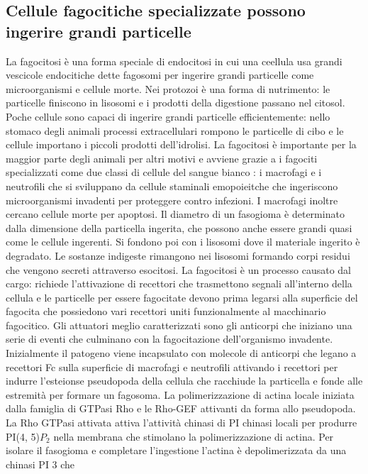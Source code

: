 \subsection{Cellule fagocitiche specializzate possono ingerire grandi particelle}
La fagocitosi \`e una forma speciale di endocitosi in cui una ceellula usa grandi vescicole endocitiche dette fagosomi per ingerire grandi particelle come microorganismi e cellule
morte. Nei protozoi \`e una forma di nutrimento: le particelle finiscono in lisosomi e i prodotti della digestione passano nel citosol. Poche cellule sono capaci di ingerire grandi 
particelle efficientemente: nello stomaco degli animali processi extracellulari rompono le particelle di cibo e le cellule importano i piccoli prodotti dell'idrolisi. La fagocitosi \`e
importante per la maggior parte degli animali per altri motivi e avviene grazie a i fagociti specializzati come due classi di cellule del sangue bianco : i macrofagi e i neutrofili che
si sviluppano da cellule staminali emopoieitche che ingeriscono microorganismi invadenti per proteggere contro infezioni. I macrofagi inoltre cercano cellule morte per apoptosi. Il 
diametro di un fasogioma \`e determinato dalla dimensione della particella ingerita, che possono anche essere grandi quasi come le cellule ingerenti. Si fondono poi con i lisosomi dove
il materiale ingerito \`e degradato. Le sostanze indigeste rimangono nei lisosomi formando corpi residui che vengono secreti attraverso esocitosi. La fagocitosi \`e un processo
causato dal cargo: richiede l'attivazione di recettori che trasmettono segnali all'interno della cellula e le particelle per essere fagocitate devono prima legarsi alla superficie
del fagocita che possiedono vari recettori uniti funzionalmente al macchinario fagocitico. Gli attuatori meglio caratterizzati sono gli anticorpi che iniziano una serie di eventi che
culminano con la fagocitazione dell'organismo invadente. Inizialmente il patogeno viene incapsulato con molecole di anticorpi che legano a recettori Fc sulla superficie di macrofagi e 
neutrofili attivando i recettori per indurre l'esteionse pseudopoda della cellula che racchiude la particella e fonde alle estremit\`a per formare un fagosoma. La polimerizzazione di
actina locale iniziata dalla famiglia di GTPasi Rho e le Rho-GEF attivanti da forma allo pseudopoda. La Rho GTPasi attivata attiva l'attivit\`a chinasi di PI chinasi locali per produrre
PI(4, 5)$P_2$ nella membrana che stimolano la polimerizzazione di actina. Per isolare il fasogioma e completare l'ingestione l'actina \`e depolimerizzata da una chinasi PI 3 che
